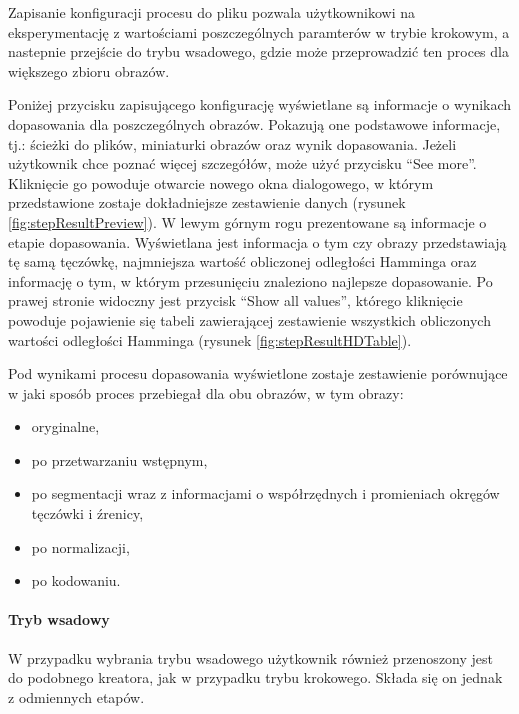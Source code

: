 Zapisanie konfiguracji procesu do pliku pozwala użytkownikowi na eksperymentację z wartościami poszczególnych
paramterów w trybie krokowym, a nastepnie przejście do trybu wsadowego, gdzie może przeprowadzi\'c ten proces
dla większego zbioru obrazów.\newline

Poniżej przycisku zapisującego konfigurację wyświetlane są informacje o wynikach dopasowania
dla poszczególnych obrazów. Pokazują one podstawowe informacje, tj.: ścieżki do plików,
miniaturki obrazów oraz wynik dopasowania. Jeżeli użytkownik chce pozna\'c więcej szczegółów, może
uży\'c przycisku ``See more''. Kliknięcie go powoduje otwarcie nowego okna dialogowego, w którym
przedstawione zostaje dokładniejsze zestawienie danych (rysunek \ref{fig:stepResultPreview}).
W lewym górnym rogu prezentowane są informacje o etapie dopasowania. Wyświetlana jest informacja
o tym czy obrazy przedstawiają tę samą tęczówkę, najmniejsza wartoś\'c obliczonej odległości Hamminga
oraz informację o tym, w którym przesunięciu znaleziono najlepsze dopasowanie.
Po prawej stronie widoczny jest przycisk ``Show all values'', którego kliknięcie powoduje
pojawienie się tabeli zawierającej zestawienie wszystkich obliczonych wartości odległości Hamminga
(rysunek \ref{fig:stepResultHDTable}).

Pod wynikami procesu dopasowania wyświetlone zostaje zestawienie porównujące w jaki sposób
proces przebiegał dla obu obrazów, w tym obrazy:

\begin{itemize}
  \item oryginalne,
  \item po przetwarzaniu wstępnym,
  \item po segmentacji wraz z informacjami o współrzędnych i promieniach okręgów tęczówki i \'zrenicy,
  \item po normalizacji,
  \item po kodowaniu.
\end{itemize}

\paragraph{Tryb wsadowy\newline}

W przypadku wybrania trybu wsadowego użytkownik również przenoszony jest do podobnego kreatora,
jak w przypadku trybu krokowego. Składa się on jednak z odmiennych etapów.\newline


